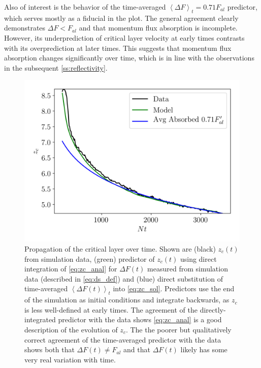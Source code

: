 \documentclass[
        fleqn,
        usenatbib,
    ]{mnras}
\newcommand*{\ev}[1]{\left\langle#1\right\rangle}
\begin{document}
Also of interest is the behavior of the time-averaged $\ev{\Delta F}_t =
0.71F_{al}$ predictor, which serves mostly as a fiducial in the plot. The
general agreement clearly demonstrates $\Delta F < F_{al}$ and that momentum
flux absorption is incomplete. However, its underprediction of critical layer
velocity at early times contrasts with its overprediction at later times. This
suggests that momentum flux absorption changes significantly over time, which is
in line with the observations in the subsequent \autoref{ss:reflectivity}.

\begin{figure}
    \centering
    \includegraphics[width=\columnwidth]{plots/nl_front.png}
    \caption{Propagation of the critical layer over time. Shown are (black)
    $z_c(t)$ from simulation data, (green) predictor of $z_c(t)$ using direct
    integration of \autoref{eq:zc_anal} for $\Delta F(t)$ measured from
    simulation data (described in \autoref{eq:ds_def}) and (blue) direct
    substitution of time-averaged $\ev{\Delta F(t)}_t$ into
    \autoref{eq:zc_sol}. Predictors use the end of the simulation as initial
    conditions and integrate backwards, as $z_c$ is less well-defined at early
    times. The agreement of the directly-integrated predictor with the data
    shows \autoref{eq:zc_anal} is a good description of the evolution of $z_c$.
    The the poorer but qualitatively correct agreement of the time-averaged
    predictor with the data shows both that $\Delta F(t) \neq F_{al}$ and that
    $\Delta F(t)$ likely has some very real variation with
    time.}\label{fig:nl_front}
\end{figure}
\end{document}
